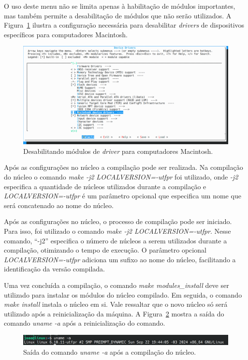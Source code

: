 \documentclass[
	12pt,				%
	oneside,   	        %
	a4paper,			%
	english,			%
	french,				%
	spanish,			%
	brazil,				%
	]{pacotes/abntex2}
\begin{document}
O uso deste menu não se limita apenas à habilitação de módulos importantes, mas também permite a desabilitação de módulos que não serão utilizados. A Figura~\ref{fig:macintosh} ilustra a configuração necessária para desabilitar \textit{drivers} de dispositivos específicos para computadores Macintosh.

\begin{figure}[H]
  \centering
  \includegraphics[scale=0.3]{figuras/macintosh.png}
  \caption{Desabilitando módulos de \textit{driver} para computadores Macintosh.}
  \label{fig:macintosh}
\end{figure}

Após as configurações no núcleo a compilação pode ser realizada. Na compilação do núcleo o comando \textit{make -j2 LOCALVERSION=-utfpr} foi utilizado, onde \textit{-j2} especifica a quantidade de núcleos utilizados durante a compilação e \textit{LOCALVERSION=-utfpr} é um parâmetro opcional que especifica um nome que será concatenado ao nome do núcleo.

Após as configurações no núcleo, o processo de compilação pode ser iniciado. Para isso, foi utilizado o comando \textit{make -j2 LOCALVERSION=-utfpr}. Nesse comando, ``-j2'' especifica o número de núcleos a serem utilizados durante a compilação, otimizando o tempo de execução. O parâmetro opcional \textit{LOCALVERSION=-utfpr} adiciona um sufixo ao nome do núcleo, facilitando a identificação da versão compilada.

Uma vez concluída a compilação, o comando \textit{make modules\_install} deve ser utilizado para instalar os módulos do núcleo compilado. Em seguida, o comando \textit{make install} instala o núcleo em si. Vale ressaltar que o novo núcleo só será utilizado após a reinicialização da máquina. A Figura~\ref{fig:uname_pos} mostra a saída do comando \textit{uname -a} após a reinicialização do comando.

\begin{figure}[H]
  \centering
  \includegraphics[scale=0.3]{figuras/uname_pos.png}
  \caption{Saída do comando \textit{uname -a} após a compilação do núcleo.}
  \label{fig:uname_pos}
\end{figure}
\end{document}
